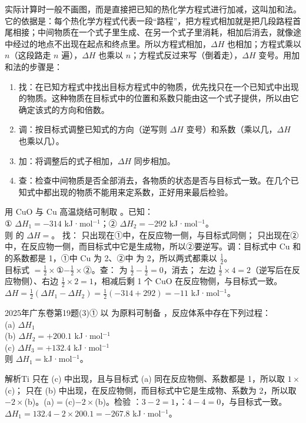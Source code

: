 实际计算时一般不画图，而是直接把已知的热化学方程式进行加减，这叫加和法。它的依据是：每个热化学方程式代表一段“路程”，把方程式相加就是把几段路程首尾相接；中间物质在一个式子里生成、在另一个式子里消耗，相加后消去，就像途中经过的地点不出现在起点和终点里。所以方程式相加，$\Delta H$ 也相加；方程式乘以 $n$（这段路走 $n$ 遍），$\Delta H$ 也乘以 $n$；方程式反过来写（倒着走），$\Delta H$ 变号。用加和法的步骤是：
\begin{enumerate}
\item 找：在已知方程式中找出目标方程式中的物质，优先找只在一个已知式中出现的物质。这种物质在目标式中的位置和系数只能由这一个式子提供，所以由它确定该式的方向和倍数。
\item 调：按目标式调整已知式的方向（逆写则 $\Delta H$ 变号）和系数（乘以几，$\Delta H$ 也乘以几）。
\item 加：将调整后的式子相加，$\Delta H$ 同步相加。
\item 查：检查中间物质是否全部消去，各物质的状态是否与目标式一致。在几个已知式中都出现的物质不能用来定系数，正好用来最后检验。
\end{enumerate}

\begin{liti}[基础]
用 CuO 与 Cu 高温烧结可制取 。已知：\\
① $\Delta H_1=-314$ kJ·mol$^{-1}$；② $\Delta H_2=-292$ kJ·mol$^{-1}$。\\
则  的 $\Delta H=$\tk。
\tcblower
\silu 找： 只出现在①中，在反应物一侧，与目标式同侧； 只出现在②中，在反应物一侧，而目标式中它是生成物，所以②要逆写。调：目标式中 Cu 和  的系数都是 1，①中 Cu 为 2、②中  为 2，所以两式都乘以 $\frac12$。\\
\jie 目标式 $=\frac12\times$①$-\frac12\times$②。查： 为 $\frac12-\frac12=0$，消去； 左边 $\frac12\times4=2$（逆写后在反应物侧）、右边 $\frac12\times2=1$，相减后剩 1 个 CuO 在反应物侧，与目标式一致。$\Delta H=\frac12(\Delta H_1-\Delta H_2)=\frac12(-314+292)=-11$ kJ·mol$^{-1}$。
\end{liti}

\begin{zhenti}{2025年广东卷第19题(3)①}
以  为原料可制备 ，反应体系中存在下列过程：\\
(a) \quad $\Delta H_1$\\
(b) \quad $\Delta H_2=+200.1$ kJ·mol$^{-1}$\\
(c) \quad $\Delta H_3=+132.4$ kJ·mol$^{-1}$\\
则 $\Delta H_1=$\tk kJ·mol$^{-1}$。

{\heiti 解析}\quad Ti 只在 (c) 中出现，且与目标式 (a) 同在反应物侧、系数都是 1，所以取 $1\times$(c)； 只在 (b) 中出现，在反应物侧，而目标式中它是生成物、系数为 2，所以取 $-2\times$(b)。(a)$=$(c)$-2\times$(b)。检验 ：$3-2=1$，：$4-4=0$，与目标式一致。$\Delta H_1=132.4-2\times200.1=-267.8$ kJ·mol$^{-1}$。
\end{zhenti}


